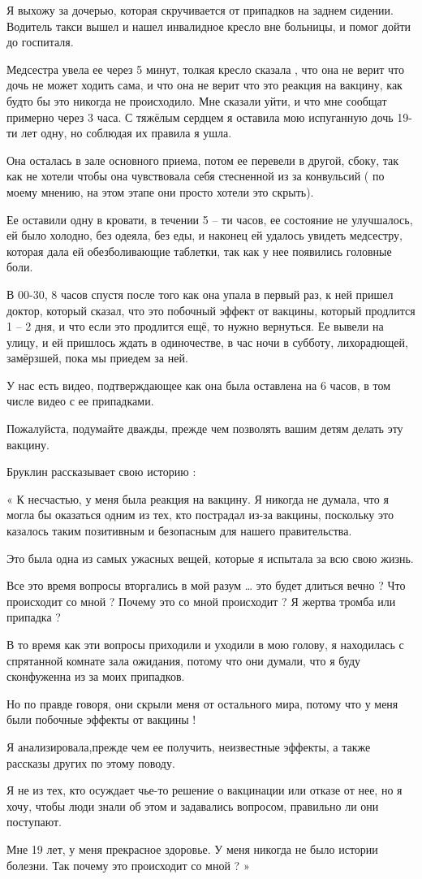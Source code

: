 {Я выхожу за дочерью, которая скручивается от припадков на заднем
сидении. Водитель такси вышел и нашел инвалидное кресло вне больницы, и помог
дойти до госпиталя.

Медсестра увела ее через 5 минут, толкая кресло сказала , что она не верит что
дочь не может ходить сама, и что она не верит что это реакция на вакцину, как
будто бы это никогда не происходило. Мне сказали уйти, и что мне сообщат
примерно через 3 часа. С тяжёлым сердцем я оставила мою испуганную дочь 19-ти
лет одну, но соблюдая их правила я ушла.

Она осталась в зале основного приема, потом ее перевели в другой, сбоку, так как
не хотели чтобы она чувствовала себя стесненной из за конвульсий ( по моему
мнению, на этом этапе они просто хотели это скрыть).

Ее оставили одну в кровати, в течении 5 – ти часов, ее состояние не улучшалось,
ей было холодно, без одеяла, без еды, и наконец ей удалось увидеть медсестру,
которая дала ей обезболивающие таблетки, так как у нее появились головные боли.

В 00-30, 8 часов спустя после того как она упала в первый раз, к ней пришел
доктор, который сказал, что это побочный эффект от вакцины, который продлится 1
– 2 дня, и что если это продлится ещё, то нужно вернуться. Ее вывели на улицу, и
ей пришлось ждать в одиночестве, в час ночи в субботу, лихорадющей, замёрзшей,
пока мы приедем за ней.

У нас есть видео, подтверждающее как она была оставлена на 6 часов, в том числе
видео с ее припадками.

Пожалуйста, подумайте дважды, прежде чем позволять вашим детям делать эту
вакцину.

Бруклин рассказывает свою историю :

« К несчастью, у меня была реакция на вакцину. Я никогда не думала, что я могла
бы оказаться одним из тех, кто пострадал из-за вакцины, поскольку это казалось
таким позитивным и безопасным для нашего правительства.

Это была одна из самых ужасных вещей, которые я испытала за всю свою жизнь.

Все это время вопросы вторгались в мой разум … это будет длиться вечно ? Что
происходит со мной ? Почему это со мной происходит ? Я жертва тромба или
припадка ?

В то время как эти вопросы приходили и уходили в мою голову, я находилась с
спрятанной комнате зала ожидания, потому что они думали, что я буду сконфуженна
из за моих припадков.

Но по правде говоря, они скрыли меня от остального мира, потому что у меня были
побочные эффекты от вакцины !

Я анализировала,прежде чем ее получить, неизвестные эффекты, а также рассказы
других по этому поводу.

Я не из тех, кто осуждает чье-то решение о вакцинации или отказе от нее, но я
хочу, чтобы люди знали об этом и задавались вопросом, правильно ли они
поступают.

Мне 19 лет, у меня прекрасное здоровье. У меня никогда не было истории
болезни. Так почему это происходит со мной ? »

}
